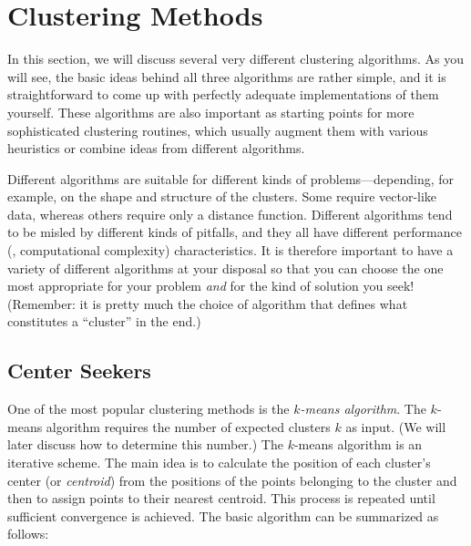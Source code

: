 \vspace*{-6pt}
\section{Clustering Methods}


In this section, we will discuss several very different clustering
algorithms. As you will see, the basic ideas behind all three
algorithms\vadjust{\pagebreak} are rather simple, and it is straightforward
to come up with perfectly adequate implementations of them yourself. These
algorithms are also important as starting points for more
sophisticated clustering routines, which usually augment them with
various heuristics or combine ideas from different algorithms.

Different algorithms are suitable for different kinds of
problems---depending, for example, on the shape and structure of the
clusters. Some require vector-like data, whereas others require only a
distance function. Different algorithms tend to be misled by different
kinds of pitfalls, and they all have different performance (\ie,
computational complexity) characteristics. It is therefore important
to have a variety of different algorithms at your disposal so that you
can choose the one most appropriate for your problem \emph{and} for
the kind of solution you seek! (Remember: it is pretty much the choice
of algorithm that defines what constitutes a ``cluster'' in the end.)

\vspace*{-6pt}
\subsection{Center Seekers}


One of the most popular clustering methods is the \emph{$k$-means
  algorithm}.  The $k$-means algorithm requires the number of expected
clusters $k$ as input. (We will later discuss how to determine this
number.) The $k$-means algorithm is an iterative scheme.  The main
idea is to calculate the position of each cluster's center (or
\emph{centroid})  from the positions of the points belonging to the
cluster and then to assign points to their nearest centroid. This
process is repeated until sufficient convergence is achieved. The
basic algorithm can be summarized as follows:

